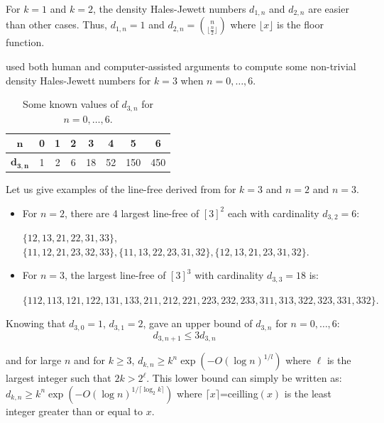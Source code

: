 For $k=1$ and $k=2$, the density Hales-Jewett numbers $d_{1,n}$ and $d_{2,n}$ are easier   than other cases.
Thus, $d_{1,n}=1$ and $d_{2,n}= {n \choose \lfloor \frac{n}{2} \rfloor}$ where $\lfloor x \rfloor $ is the floor function. 

\cite{polymath2010density} used both human and computer-assisted arguments to compute some non-trivial density Hales-Jewett numbers for $k=3$ when $n= 0,\ldots,6.$

\begin{table}[h]
\centering
\begin{tabular}{|c|c|c|c|c|c|c|c|}
\hline 
$\mathbf{n}$ & 0 & 1 & 2 & 3 & 4 & 5 & 6 \\ 
\hline 
$\mathbf{d_{3,n}}$ & 1 & 2 & 6 & 18 & 52 & 150 & 450 \\ 
\hline 
\end{tabular}
\caption{Some known values of $d_{3,n}$ for $ n= 0,\ldots,6.$}
\end{table} 

Let us give examples of the line-free derived from \cite{polymath2010density} for $k=3$ and $n=2$ and $n=3.$
\begin{itemize}
\item For $n=2$, there are 4 largest line-free of $[3]^2$ each with cardinality $d_{3,2}=6 :$ 

$ \{12, 13, 21, 22, 31, 33 \}$, $\{11, 12, 21, 23, 32, 33 \}, \{11, 13, 22, 23, 31, 32 \}, \{12, 13, 21, 23, 31, 32 \}.$
\item For $n=3$, the largest line-free of $[3]^3$ with cardinality $d_{3,3}=18$ is: 

$\{112, 113, 121, 122, 131, 133, 211, 212, 221, 223, 232, 233, 311, 313, 322, 323, 331, 332 \}.$
\end{itemize}

Knowing that $d_{3,0}=1$, $d_{3,1}=2$,  \cite{polymath2010density} gave an upper bound of $d_{3,n}$ for $n= 0,\ldots,6$: $$d_{3,n+1} \leq 3 d_{3,n}$$

and for large $n$ and for $k\geq 3$, $d_{k,n} \geq k^n \exp \left(-O(\log n)^{1/l}\right)$ where $\ell$ is the largest integer such that $2k > 2^{\ell}$. This lower bound can simply be written as: $d_{k,n} \geq k^n  \exp \left(-O(\log n)^{1/\lceil \log_2 k \rceil}\right)$ where $\lceil x \rceil$=ceilling$(x)$ is the least integer greater than or equal to $x.$ 
%

